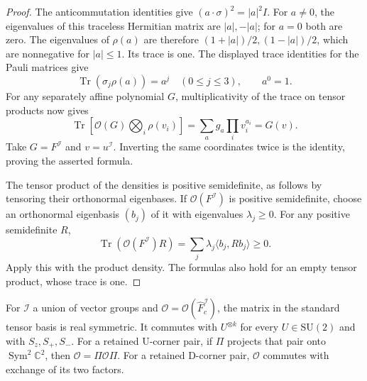 \begin{proof}
The anticommutation identities give
\((a\cdot\sigma)^2=|a|^2I\).  For \(a\ne0\), the eigenvalues
of this traceless Hermitian matrix are \(|a|,-|a|\); for
\(a=0\) both are zero.  The eigenvalues of \(\rho(a)\) are
therefore \((1+|a|)/2,(1-|a|)/2\), which are nonnegative for
\(|a|\le1\).  Its trace is one.  The displayed trace identities
for the Pauli matrices give
\[
 \operatorname{Tr}(\sigma_j\rho(a))=a^j
       \quad(0\le j\le3),\qquad a^0=1.
\]
For any separately affine polynomial \(G\), multiplicativity
of the trace on tensor products now gives
\[
 \operatorname{Tr}\left[\mathcal O(G)
                          \bigotimes_i\rho(v_i)\right]
       =\sum_a g_a\prod_i v_i^{a_i}=G(v).
\]
Take \(G=F^{\mathcal I}\) and \(v=u^{\mathcal I}\).
Inverting the same coordinates twice is the identity, proving
the asserted formula.

The tensor product of the densities is positive semidefinite,
as follows by tensoring their orthonormal eigenbases.  If
\(\mathcal O(F^{\mathcal I})\) is positive semidefinite, choose
an orthonormal eigenbasis \((b_j)\) of it with eigenvalues
\(\lambda_j\ge0\).  For any positive semidefinite \(R\),
\[
 \operatorname{Tr}(\mathcal O(F^{\mathcal I})R)
       =\sum_j\lambda_j\langle b_j,Rb_j\rangle\ge0.
\]
Apply this with the product density.  The formulas also hold
for an empty tensor product, whose trace is one.
\end{proof}

\begin{lemma}\label{l:Ostruct}
For \(\mathcal I\) a union of vector groups and
\(\mathcal O=\mathcal O(\widehat F_c^{\mathcal I})\),
the matrix in the standard tensor basis is real symmetric.
It commutes with \(U^{\otimes k}\) for every \(U\in\mathrm{SU}(2)\)
and with \(S_z,S_+,S_-\).
For a retained \(\mathrm U\)-corner pair, if \(\Pi\) projects that
pair onto \(\operatorname{Sym}^2\mathbb C^2\), then
\(\mathcal O=\Pi\mathcal O\Pi\).
For a retained \(\mathrm D\)-corner pair, \(\mathcal O\) commutes
with exchange of its two factors.
\end{lemma}

